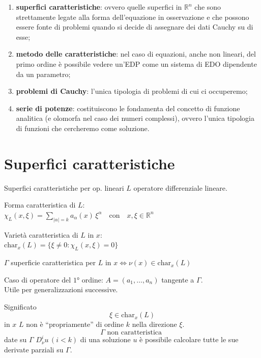 \begin{enumerate}
\item \textbf{superfici caratteristiche}: ovvero quelle superfici in $\mathbb{R}^n$ che sono strettamente legate alla forma dell'equazione in osservazione e che possono essere fonte di problemi quando si decide di assegnare dei dati Cauchy su di esse;
\item \textbf{metodo delle caratteristiche}: nel caso di equazioni, anche non lineari, del primo ordine è possibile vedere un'EDP come un sistema di EDO dipendente da un parametro;
\item \textbf{problemi di Cauchy}: l'unica tipologia di problemi di cui ci occuperemo;
\item \textbf{serie di potenze}: costituiscono le fondamenta del concetto di funzione analitica (e olomorfa nel caso dei numeri complessi), ovvero l'unica tipologia di funzioni che cercheremo come soluzione. 
\end{enumerate}

\newpage
\section{Superfici caratteristiche}
Superfici caratteristiche per op. lineari
$L$ operatore differenziale lineare.
\begin{definition}
Forma caratteristica di $L$:\\ $\chi_L(x,\xi)=\sum\limits_{|\alpha |= k} a_\alpha(x) \, \xi^\alpha \quad \text{con} \quad x,\xi \in \mathbb{R}^n$
\end{definition}

\begin{definition}
Varietà caratteristica di $L$ in $x$:\\ $\text{char}_x (L)= \{ \xi \neq 0 : \chi_L(x,\xi)=0 \}$
\end{definition}



\begin{definition}
$\Gamma$ superficie caratteristica per $L$ in $x \iff \nu(x) \in\text{char}_x (L)$
\end{definition}

\begin{remark}
Caso di operatore del $1$° ordine: $A=(a_1,\ldots ,a_n)$ tangente a $\Gamma$.\\
Utile per generalizzazioni successive.
\end{remark}

Significato
$$\xi \in \text{char}_x (L)$$
in $x$ $L$ non è ``propriamente'' di ordine $k$ nella direzione $\xi$.
\vspace{5mm}
$$\Gamma \text{ non caratteristica }$$ 
date su $\Gamma$ $D^i_\nu u \,(i<k)$ di una soluzione $u$
è possibile calcolare tutte le sue derivate parziali su $\Gamma$.



